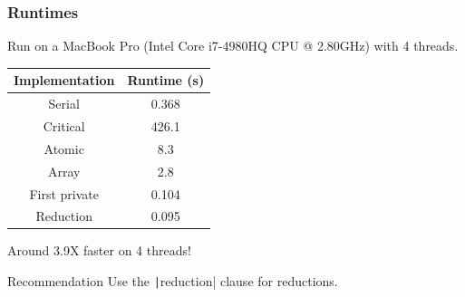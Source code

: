 \documentclass{beamer}
\begin{document}
\begin{frame}
\frametitle{Runtimes}
Run on a MacBook Pro (Intel Core i7-4980HQ CPU @ 2.80GHz) with 4 threads.

\vfill

\begin{table}
\begin{tabular}{cc}
\toprule
Implementation & Runtime (s) \\
\midrule
Serial        & 0.368 \\
Critical      & 426.1 \\
Atomic        & 8.3 \\
Array         & 2.8 \\
First private & 0.104 \\
Reduction     & 0.095 \\
\bottomrule
\end{tabular}
\end{table}

\vfill

Around 3.9X faster on 4 threads!

\vfill


\begin{block}{Recommendation}
Use the \texttt|reduction| clause for reductions.
\end{block}

\end{frame}
\end{document}
